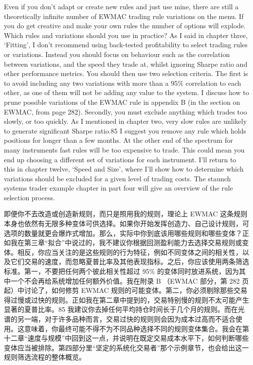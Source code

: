 

\begin{englishblock} Even if you don't adapt or create new rules and just use mine, there are still a theoretically infinite number of EWMAC trading rule variations on the menu. If you do get creative and make your own rules the number of options will explode. Which rules and variations should you use in practice? As I said in chapter three, ‘Fitting', I don't recommend using back-tested profitability to select trading rules or variations. Instead you should focus on behaviour such as the correlation between variations, and the speed they trade at, whilst ignoring Sharpe ratio and other performance metrics. You should then use two selection criteria. The first is to avoid including any two variations with more than a 95\% correlation to each other, as one of them will not be adding any value to the system. I discuss how to prune possible variations of the EWMAC rule in appendix B (in the section on EWMAC, from page 282). Secondly, you must exclude anything which trades too slowly, or too quickly. As I mentioned in chapter two, very slow rules are unlikely to generate significant Sharpe ratio.85 I suggest you remove any rule which holds positions for longer than a few months. At the other end of the spectrum for many instruments fast rules will be too expensive to trade. This could mean you end up choosing a different set of variations for each instrument. I'll return to this in chapter twelve, ‘Speed and Size', where I'll show how to determine which variations should be excluded for a given level of trading costs. The staunch systems trader example chapter in part four will give an overview of the rule selection process. \end{englishblock}

\begin{chineseblock}即便你不去改造或创造新规则，而只是照用我的规则，理论上 EWMAC 这条规则本身也依然有无限多种变体可供选择。如果你开始发挥创造力、自己设计规则，可选项的数量就更会爆炸式增加。那么，实际中你到底该用哪些规则和哪些变体？正如我在第三章“拟合”中说过的，我不建议你根据回测盈利能力去选择交易规则或变体。相反，你应当关注的是这些规则的行为特征，例如不同变体之间的相关性，以及它们交易的速度，而忽略夏普比率及其他表现指标。之后，你应该使用两条筛选标准。第一，不要把任何两个彼此相关性超过 95\% 的变体同时放进系统，因为其中一个不会再给系统增加任何额外价值。我在附录 B （EWMAC 部分，第 282 页起）中讨论了，如何修剪 EWMAC 规则的可能变体。第二，你必须剔除那些交易得过慢或过快的规则。正如我在第二章中提到的，交易特别慢的规则不太可能产生显著的夏普比率。85 我建议你去掉任何平均持仓时间长于几个月的规则。而在光谱的另一端，对于许多品种而言，交易过快的规则则会因为成本过高而不适合使用。这意味着，你最终可能不得不为不同品种选择不同的规则变体集合。我会在第十二章“速度与规模”中回到这一点，并说明在既定交易成本水平下，如何判断哪些变体应当被排除。第四部分里“坚定的系统化交易者”那个示例章节，也会给出这一规则筛选流程的整体概览。\end{chineseblock}

